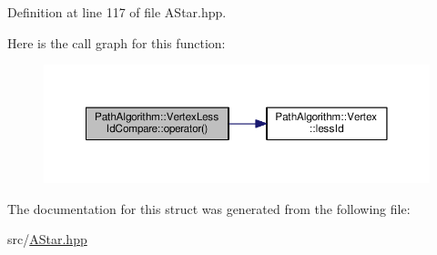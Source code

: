 Definition at line 117 of file A\+Star.\+hpp.



Here is the call graph for this function\+:\nopagebreak
\begin{figure}[H]
\begin{center}
\leavevmode
\includegraphics[width=350pt]{struct_path_algorithm_1_1_vertex_less_id_compare_adb205b9c837c7e884ccc2ec32cc69cfc_cgraph}
\end{center}
\end{figure}




The documentation for this struct was generated from the following file\+:\begin{DoxyCompactItemize}
\item 
src/\hyperlink{_a_star_8hpp}{A\+Star.\+hpp}\end{DoxyCompactItemize}

